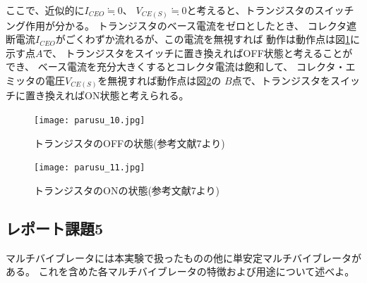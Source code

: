 \documentclass[12pt]{jarticle}
\begin{document}
ここで、近似的に$I_{CEO} \fallingdotseq 0$、
$V_{CE(S)} \fallingdotseq 0$と考えると、トランジスタのスイッチング作用が分かる。
トランジスタのベース電流をゼロとしたとき、
コレクタ遮断電流$I_{CEO}$がごくわずか流れるが、この電流を無視すれば
動作は動作点は図\ref{fig10}に示す点$A$で、
トランジスタをスイッチに置き換えればOFF状態と考えることができ、
ベース電流を充分大きくするとコレクタ電流は飽和して、
コレクタ・エミッタの電圧$V_{CE(S)}$を無視すれば動作点は図\ref{fig11}の
$B$点で、トランジスタをスイッチに置き換えればON状態と考えられる。

\begin{figure}[h]
    \begin{center}
        \texttt{[image: parusu\_10.jpg]}
    \end{center}
    \caption{トランジスタのOFFの状態(参考文献7より)}
    \label{fig10}
\end{figure}
\begin{figure}[h]
    \begin{center}
        \texttt{[image: parusu\_11.jpg]}
    \end{center}
    \caption{トランジスタのONの状態(参考文献7より)}
    \label{fig11}
\end{figure}

\clearpage
\subsection{レポート課題5}
\begin{shadebox}
    マルチバイブレータには本実験で扱ったものの他に単安定マルチバイブレータがある。
    これを含めた各マルチバイブレータの特徴および用途について述べよ。
\end{shadebox}
\end{document}
